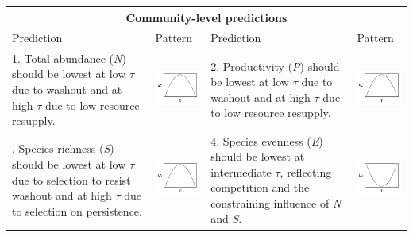 \documentclass{article}
\begin{document}
\oddsidemargin-1cm
\textwidth19cm
\begin{table}
\setlength\tabcolsep{6pt} %
\centering
\begin{tabularx}{\textwidth}{m{5.6cm} m{3.4cm} m{5.6cm} m{3.4cm}}
 
\hline
\toprule
\multicolumn{4}{c}{Community-level predictions} \\
\midrule
\hline
\toprule
Prediction & Pattern & Prediction & Pattern\\ [0.5ex]
\midrule

1. Total abundance (\textit{N}) should be lowest at low $\tau$ due to washout and at high $\tau$ due to low resource resupply.
&
\begin{minipage}{.3\textwidth}
\includegraphics[width=30mm, height=25mm]{predictions/N}
\end{minipage}
&
2. Productivity (\textit{P}) should be lowest at low $\tau$ due to washout and at high $\tau$ due to low resource resupply.
&
\begin{minipage}{.3\textwidth}
\includegraphics[width=30mm, height=25mm]{predictions/P}
\end{minipage} \\
    
\addlinespace
3. Species richness (\textit{S}) should be lowest at low $\tau$ due to selection to resist washout and at high $\tau$ due to selection on persistence.
&
\begin{minipage}{.3\textwidth}
\includegraphics[width=30mm, height=25mm]{predictions/S}
\end{minipage}
&
4. Species evenness (\textit{E}) should be lowest at intermediate $\tau$, reflecting competition and the constraining influence of \textit{N} and \textit{S}.
&
\begin{minipage}{.3\textwidth}
\includegraphics[width=30mm, height=25mm]{predictions/E}
\end{minipage} \\
 

\end{tabularx}
\end{table}
\end{document}
